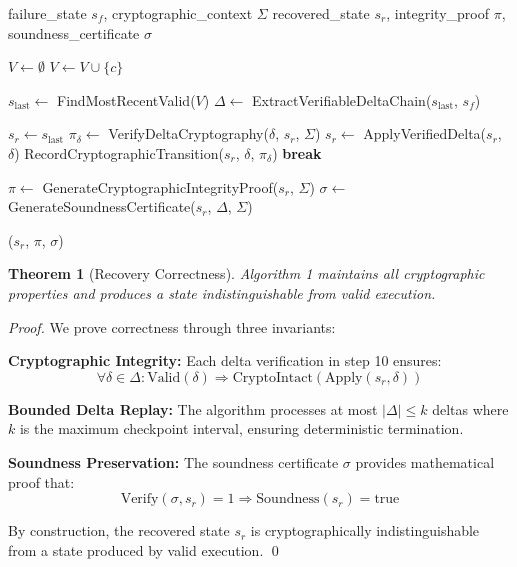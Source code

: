 \documentclass[11pt,a4paper]{article}
\newtheorem{theorem}{Theorem}[section]
\theoremstyle{definition}
\theoremstyle{remark}
\begin{document}
\begin{algorithm}
\caption{Cryptographically-Safe State Recovery}
\begin{algorithmic}[1]
\REQUIRE failure\_state $s_f$, cryptographic\_context $\Sigma$
\ENSURE recovered\_state $s_r$, integrity\_proof $\pi$, soundness\_certificate $\sigma$

\STATE $V \leftarrow \emptyset$ 
        \STATE $V \leftarrow V \cup \{c\}$
    \ENDIF
\ENDFOR

\STATE $s_{\text{last}} \leftarrow$ FindMostRecentValid($V$)
\STATE $\Delta \leftarrow$ ExtractVerifiableDeltaChain($s_{\text{last}}$, $s_f$)

\STATE $s_r \leftarrow s_{\text{last}}$
    \STATE $\pi_{\delta} \leftarrow$ VerifyDeltaCryptography($\delta$, $s_r$, $\Sigma$)
        \STATE $s_r \leftarrow$ ApplyVerifiedDelta($s_r$, $\delta$)
        \STATE RecordCryptographicTransition($s_r$, $\delta$, $\pi_{\delta}$)
    \ELSE
        \STATE \textbf{break} 
    \ENDIF
\ENDFOR

\STATE $\pi \leftarrow$ GenerateCryptographicIntegrityProof($s_r$, $\Sigma$)
\STATE $\sigma \leftarrow$ GenerateSoundnessCertificate($s_r$, $\Delta$, $\Sigma$)

\RETURN ($s_r$, $\pi$, $\sigma$)
\end{algorithmic}
\end{algorithm}

\begin{theorem}[Recovery Correctness]
Algorithm 1 maintains all cryptographic properties and produces a state indistinguishable from valid execution.
\end{theorem}

\begin{proof}
We prove correctness through three invariants:

\textbf{Cryptographic Integrity:} Each delta verification in step 10 ensures:
$$\forall \delta \in \Delta : \text{Valid}(\delta) \Rightarrow \text{CryptoIntact}(\text{Apply}(s_r, \delta))$$

\textbf{Bounded Delta Replay:} The algorithm processes at most $|\Delta| \leq k$ deltas where $k$ is the maximum checkpoint interval, ensuring deterministic termination.

\textbf{Soundness Preservation:} The soundness certificate $\sigma$ provides mathematical proof that:
$$\text{Verify}(\sigma, s_r) = 1 \Rightarrow \text{Soundness}(s_r) = \text{true}$$

By construction, the recovered state $s_r$ is cryptographically indistinguishable from a state produced by valid execution. \qed
\end{proof}
\end{document}
